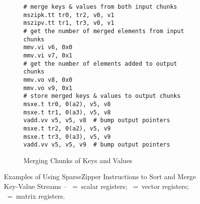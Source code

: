 \begin{figure*}[tp]
\begin{subfigure}[t]{\cw}
\begin{lstlisting}[xleftmargin=0.025\tw]
# merge keys & values from both input chunks
mszipk.tt tr0, tr2, v0, v1
mszipv.tt tr1, tr3, v0, v1
# get the number of merged elements from input chunks
mmv.vi v6, 0x0
mmv.vi v7, 0x1
# get the number of elements added to output chunks
mmv.vo v8, 0x0
mmv.vo v9, 0x1
# store merged keys & values to output chunks
msxe.t tr0, 0(a2), v5, v8
msxe.t tr1, 0(a3), v5, v8
vadd.vv v5, v5, v8  # bump output pointers
msxe.t tr2, 0(a2), v5, v9
msxe.t tr3, 0(a3), v5, v9
vadd.vv v5, v5, v9  # bump output pointers
\end{lstlisting}
    \vspace{-0.4cm}
    \caption{Merging Chunks of Keys and Values}
    \label{fig-spz-mszip-code}
  \end{subfigure}
  \caption{
    Examples of Using SparseZipper Instructions to Sort and Merge Key-Value Streams --
    ~=~scalar registers;
    ~=~vector registers;
    ~=~matrix registers.
  }
  \label{fig-spz-code}
  \vspace{-0.3cm}
\end{figure*}
